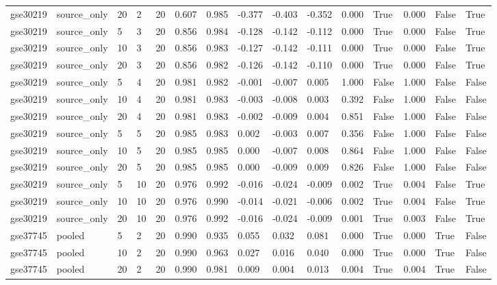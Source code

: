 \begin{table}[t]
\begin{tabular}{lllllllllllllll}
    gse30219 & source\_only & 20 & 2 & 20 & 0.607 & 0.985 & -0.377 & -0.403 & -0.352 & 0.000 & True & 0.000 & False & True \\
    gse30219 & source\_only & 5 & 3 & 20 & 0.856 & 0.984 & -0.128 & -0.142 & -0.112 & 0.000 & True & 0.000 & False & True \\
    gse30219 & source\_only & 10 & 3 & 20 & 0.856 & 0.983 & -0.127 & -0.142 & -0.111 & 0.000 & True & 0.000 & False & True \\
    gse30219 & source\_only & 20 & 3 & 20 & 0.856 & 0.982 & -0.126 & -0.142 & -0.110 & 0.000 & True & 0.000 & False & True \\
    gse30219 & source\_only & 5 & 4 & 20 & 0.981 & 0.982 & -0.001 & -0.007 & 0.005 & 1.000 & False & 1.000 & False & False \\
    gse30219 & source\_only & 10 & 4 & 20 & 0.981 & 0.983 & -0.003 & -0.008 & 0.003 & 0.392 & False & 1.000 & False & False \\
    gse30219 & source\_only & 20 & 4 & 20 & 0.981 & 0.983 & -0.002 & -0.009 & 0.004 & 0.851 & False & 1.000 & False & False \\
    gse30219 & source\_only & 5 & 5 & 20 & 0.985 & 0.983 & 0.002 & -0.003 & 0.007 & 0.356 & False & 1.000 & False & False \\
    gse30219 & source\_only & 10 & 5 & 20 & 0.985 & 0.985 & 0.000 & -0.007 & 0.008 & 0.864 & False & 1.000 & False & False \\
    gse30219 & source\_only & 20 & 5 & 20 & 0.985 & 0.985 & 0.000 & -0.009 & 0.009 & 0.826 & False & 1.000 & False & False \\
    gse30219 & source\_only & 5 & 10 & 20 & 0.976 & 0.992 & -0.016 & -0.024 & -0.009 & 0.002 & True & 0.004 & False & True \\
    gse30219 & source\_only & 10 & 10 & 20 & 0.976 & 0.990 & -0.014 & -0.021 & -0.006 & 0.002 & True & 0.004 & False & True \\
    gse30219 & source\_only & 20 & 10 & 20 & 0.976 & 0.992 & -0.016 & -0.024 & -0.009 & 0.001 & True & 0.003 & False & True \\
    gse37745 & pooled & 5 & 2 & 20 & 0.990 & 0.935 & 0.055 & 0.032 & 0.081 & 0.000 & True & 0.000 & True & False \\
    gse37745 & pooled & 10 & 2 & 20 & 0.990 & 0.963 & 0.027 & 0.016 & 0.040 & 0.000 & True & 0.000 & True & False \\
    gse37745 & pooled & 20 & 2 & 20 & 0.990 & 0.981 & 0.009 & 0.004 & 0.013 & 0.004 & True & 0.004 & True & False \\

\end{tabular}
\end{table}
